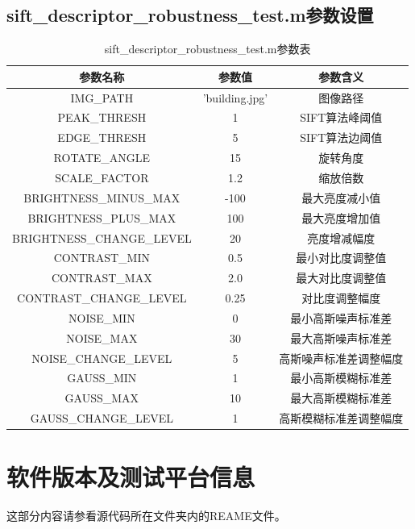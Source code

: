 \documentclass[a4paper, UTF8]{ctexrep}
\begin{document}
    \subsection{sift\_descriptor\_robustness\_test.m参数设置}
      \begin{table}[htbp!]
        \centering
        \begin{tabular}{ccc}
        \hline
        参数名称 & 参数值 & 参数含义 \\
        \hline
        IMG\_PATH & 'building.jpg' & 图像路径 \\
        PEAK\_THRESH & 1 & SIFT算法峰阈值 \\
        EDGE\_THRESH & 5 & SIFT算法边阈值 \\
        ROTATE\_ANGLE & 15 & 旋转角度 \\
        SCALE\_FACTOR & 1.2 & 缩放倍数 \\
        BRIGHTNESS\_MINUS\_MAX & -100 & 最大亮度减小值 \\
        BRIGHTNESS\_PLUS\_MAX & 100 & 最大亮度增加值 \\
        BRIGHTNESS\_CHANGE\_LEVEL & 20 & 亮度增减幅度 \\
        CONTRAST\_MIN & 0.5 & 最小对比度调整值 \\
        CONTRAST\_MAX & 2.0 & 最大对比度调整值 \\
        CONTRAST\_CHANGE\_LEVEL & 0.25 & 对比度调整幅度 \\
        NOISE\_MIN & 0 & 最小高斯噪声标准差 \\
        NOISE\_MAX & 30 & 最大高斯噪声标准差 \\
        NOISE\_CHANGE\_LEVEL & 5 & 高斯噪声标准差调整幅度 \\
        GAUSS\_MIN & 1 & 最小高斯模糊标准差 \\
        GAUSS\_MAX & 10 & 最大高斯模糊标准差 \\
        GAUSS\_CHANGE\_LEVEL & 1 & 高斯模糊标准差调整幅度 \\
        \hline
        \end{tabular}
        \caption{sift\_descriptor\_robustness\_test.m参数表}
      \end{table}


  \section{软件版本及测试平台信息}
    这部分内容请参看源代码所在文件夹内的REAME文件。
\end{document}
